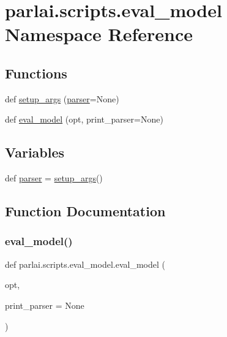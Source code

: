 \hypertarget{namespaceparlai_1_1scripts_1_1eval__model}{}\section{parlai.\+scripts.\+eval\+\_\+model Namespace Reference}
\label{namespaceparlai_1_1scripts_1_1eval__model}
\subsection*{Functions}
\begin{DoxyCompactItemize}
\item 
def \hyperlink{namespaceparlai_1_1scripts_1_1eval__model_a2eaba0aa76c4d83e2a0f7f77c23479c8}{setup\+\_\+args} (\hyperlink{namespaceparlai_1_1scripts_1_1eval__model_ad0eac535b81763908ecc3cc63c12c885}{parser}=None)
\item 
def \hyperlink{namespaceparlai_1_1scripts_1_1eval__model_ade1dfda1be70776553a1fbd6a3450c40}{eval\+\_\+model} (opt, print\+\_\+parser=None)
\end{DoxyCompactItemize}
\subsection*{Variables}
\begin{DoxyCompactItemize}
\item 
def \hyperlink{namespaceparlai_1_1scripts_1_1eval__model_ad0eac535b81763908ecc3cc63c12c885}{parser} = \hyperlink{namespaceparlai_1_1scripts_1_1eval__model_a2eaba0aa76c4d83e2a0f7f77c23479c8}{setup\+\_\+args}()
\end{DoxyCompactItemize}


\subsection{Function Documentation}
\mbox{\label{namespaceparlai_1_1scripts_1_1eval__model_ade1dfda1be70776553a1fbd6a3450c40}} 
\subsubsection{\texorpdfstring{eval\+\_\+model()}{eval\_model()}}
{\footnotesize\ttfamily def parlai.\+scripts.\+eval\+\_\+model.\+eval\+\_\+model (\begin{DoxyParamCaption}\item[{}]{opt,  }\item[{}]{print\+\_\+parser = {\ttfamily None} }\end{DoxyParamCaption})}

